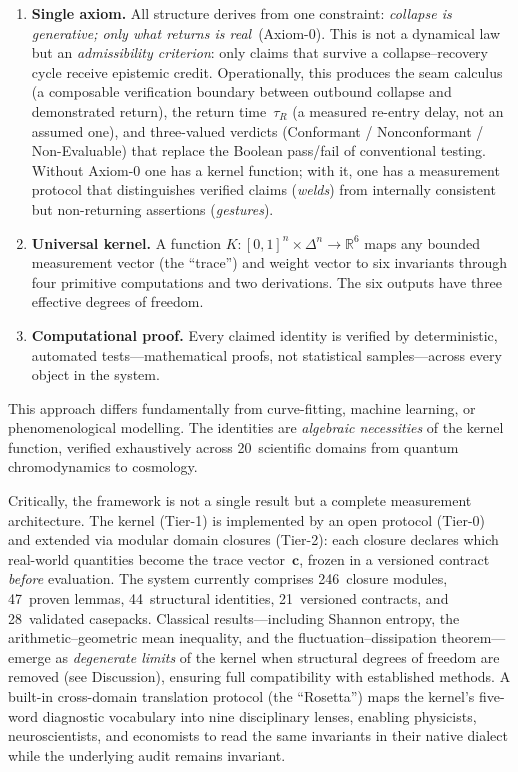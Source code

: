 \documentclass[
  aps,
  prx,
  twocolumn,
  superscriptaddress,
  nofootinbib,
  floatfix
]{revtex4-2}
\newcommand{\tR}{\tau_{\!R}}
\newcommand{\tvec}{\mathbf{c}}
\begin{document}
\begin{enumerate}[leftmargin=2em,itemsep=2pt]
\item \textbf{Single axiom.} All structure derives from one
  constraint: \emph{collapse is generative; only what returns is
  real}~(Axiom-0). This is not a dynamical law but an
  \emph{admissibility criterion}: only claims that survive a
  collapse--recovery cycle receive epistemic credit. Operationally,
  this produces the seam calculus (a composable verification
  boundary between outbound collapse and demonstrated return), the
  return time~$\tR$ (a measured re-entry delay, not an assumed one),
  and three-valued verdicts (Conformant / Nonconformant /
  Non-Evaluable) that replace the Boolean pass/fail of conventional
  testing. Without Axiom-0 one has a kernel function; with it, one
  has a measurement protocol that distinguishes verified claims
  (\emph{welds}) from internally consistent but non-returning
  assertions (\emph{gestures}).
\item \textbf{Universal kernel.} A function
  $K\!:\![0,1]^n \times \Delta^n \to \mathbb{R}^6$ maps any bounded
  measurement vector (the ``trace'') and weight vector to six
  invariants through four primitive computations and two derivations.
  The six outputs have three effective degrees of freedom.
\item \textbf{Computational proof.} Every claimed identity is verified
  by deterministic, automated tests---mathematical proofs, not
  statistical samples---across every object in the system.
\end{enumerate}

This approach differs fundamentally from curve-fitting, machine
learning, or phenomenological modelling. The identities are
\emph{algebraic necessities} of the kernel function, verified
exhaustively across 20~scientific domains from quantum
chromodynamics to cosmology.

Critically, the framework is not a single result but a complete
measurement architecture. The kernel (Tier-1) is implemented by
an open protocol (Tier-0) and extended via modular domain
closures (Tier-2): each closure declares which real-world
quantities become the trace vector~$\tvec$, frozen in a versioned
contract \emph{before} evaluation. The system currently comprises
246~closure modules, 47~proven lemmas, 44~structural identities,
21~versioned contracts, and 28~validated casepacks. Classical
results---including Shannon entropy, the arithmetic--geometric
mean inequality, and the fluctuation--dissipation
theorem---emerge as \emph{degenerate limits} of the kernel when
structural degrees of freedom are removed (see Discussion),
ensuring full compatibility with established methods. A built-in
cross-domain translation protocol (the ``Rosetta'') maps the
kernel's five-word diagnostic vocabulary into nine disciplinary
lenses, enabling physicists, neuroscientists, and economists to
read the same invariants in their native dialect while the
underlying audit remains invariant.
\end{document}
